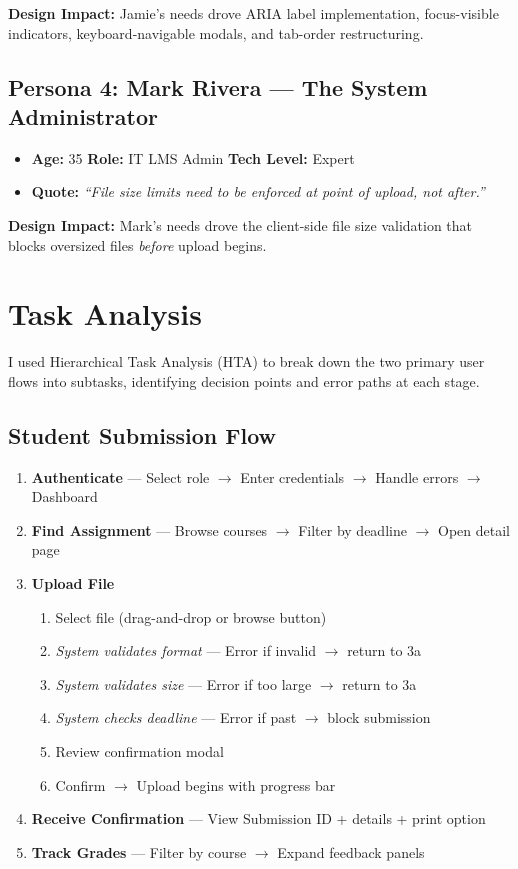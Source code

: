 \documentclass[12pt, a4paper]{article}
\begin{document}
\textbf{Design Impact:} Jamie's needs drove ARIA label implementation, focus-visible indicators, keyboard-navigable modals, and tab-order restructuring.

\subsection{Persona 4: Mark Rivera — The System Administrator}
\begin{itemize}[noitemsep]
  \item \textbf{Age:} 35 \quad \textbf{Role:} IT LMS Admin \quad \textbf{Tech Level:} Expert
  \item \textbf{Quote:} \textit{``File size limits need to be enforced at point of upload, not after.''}
\end{itemize}

\textbf{Design Impact:} Mark's needs drove the client-side file size validation that blocks oversized files \textit{before} upload begins.

\section{Task Analysis}

I used Hierarchical Task Analysis (HTA) to break down the two primary user flows into subtasks, identifying decision points and error paths at each stage.

\subsection{Student Submission Flow}

\begin{enumerate}[noitemsep]
  \item \textbf{Authenticate} — Select role $\rightarrow$ Enter credentials $\rightarrow$ Handle errors $\rightarrow$ Dashboard
  \item \textbf{Find Assignment} — Browse courses $\rightarrow$ Filter by deadline $\rightarrow$ Open detail page
  \item \textbf{Upload File}
    \begin{enumerate}[noitemsep]
      \item Select file (drag-and-drop or browse button)
      \item \textit{System validates format} — Error if invalid $\rightarrow$ return to 3a
      \item \textit{System validates size} — Error if too large $\rightarrow$ return to 3a
      \item \textit{System checks deadline} — Error if past $\rightarrow$ block submission
      \item Review confirmation modal
      \item Confirm $\rightarrow$ Upload begins with progress bar
    \end{enumerate}
  \item \textbf{Receive Confirmation} — View Submission ID + details + print option
  \item \textbf{Track Grades} — Filter by course $\rightarrow$ Expand feedback panels
\end{enumerate}
\end{document}
